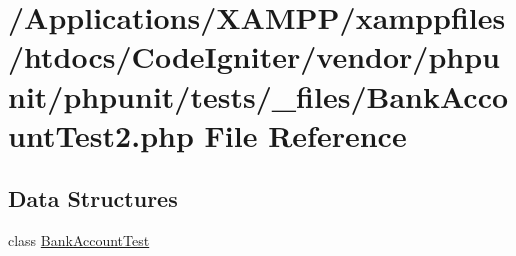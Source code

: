 \hypertarget{_bank_account_test2_8php}{}\section{/\+Applications/\+X\+A\+M\+P\+P/xamppfiles/htdocs/\+Code\+Igniter/vendor/phpunit/phpunit/tests/\+\_\+files/\+Bank\+Account\+Test2.php File Reference}
\label{_bank_account_test2_8php}
\subsection*{Data Structures}
\begin{DoxyCompactItemize}
\item 
class \mbox{\hyperlink{class_bank_account_test}{Bank\+Account\+Test}}
\end{DoxyCompactItemize}
